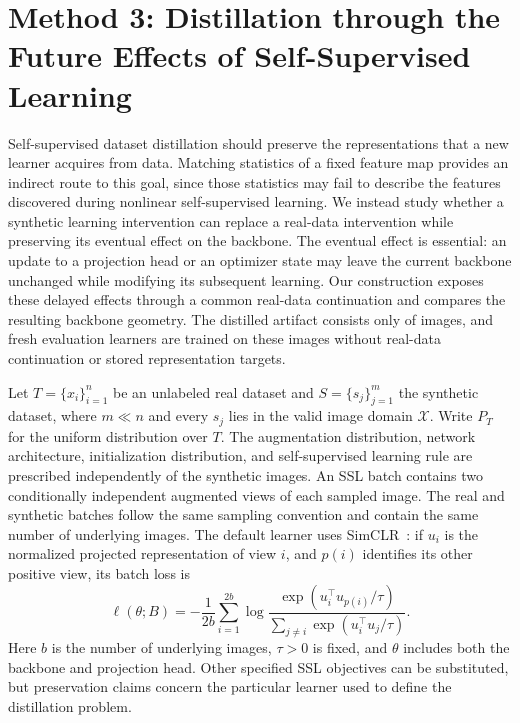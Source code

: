 
\section{Method 3: Distillation through the Future Effects of Self-Supervised Learning}
\label{sec:method3}

Self-supervised dataset distillation should preserve the representations that a new learner acquires from data. Matching statistics of a fixed feature map provides an indirect route to this goal, since those statistics may fail to describe the features discovered during nonlinear self-supervised learning. We instead study whether a synthetic learning intervention can replace a real-data intervention while preserving its eventual effect on the backbone. The eventual effect is essential: an update to a projection head or an optimizer state may leave the current backbone unchanged while modifying its subsequent learning. Our construction exposes these delayed effects through a common real-data continuation and compares the resulting backbone geometry. The distilled artifact consists only of images, and fresh evaluation learners are trained on these images without real-data continuation or stored representation targets.

Let $T=\{x_i\}_{i=1}^{n}$ be an unlabeled real dataset and $S=\{s_j\}_{j=1}^{m}$ the synthetic dataset, where $m\ll n$ and every $s_j$ lies in the valid image domain $\mathcal X$. Write $P_T$ for the uniform distribution over $T$. The augmentation distribution, network architecture, initialization distribution, and self-supervised learning rule are prescribed independently of the synthetic images. An SSL batch contains two conditionally independent augmented views of each sampled image. The real and synthetic batches follow the same sampling convention and contain the same number of underlying images. The default learner uses SimCLR~\cite{chen2020simclr}: if $u_i$ is the normalized projected representation of view $i$, and $p(i)$ identifies its other positive view, its batch loss is
\begin{equation}
\ell(\theta;B)
=-\frac{1}{2b}\sum_{i=1}^{2b}
\log\frac{\exp(u_i^\top u_{p(i)}/\tau)}
{\sum_{j\ne i}\exp(u_i^\top u_j/\tau)}.
\label{eq:m3-ssl}
\end{equation}
Here $b$ is the number of underlying images, $\tau>0$ is fixed, and $\theta$ includes both the backbone and projection head. Other specified SSL objectives can be substituted, but preservation claims concern the particular learner used to define the distillation problem.


